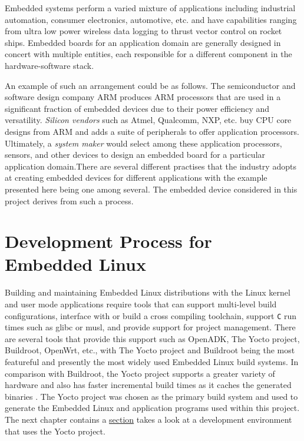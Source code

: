 Embedded systems perform a varied mixture of applications including industrial automation, consumer electronics, automotive, etc. and have capabilities ranging from ultra low power wireless data logging to thrust vector control on rocket ships. Embedded boards for an application domain are generally designed in concert with multiple entities, each responsible for a different component in the hardware-software stack.

An example of such an arrangement could be as follows. The semiconductor and software design company ARM produces ARM processors that are used in a significant fraction of embedded devices due to their power efficiency and versatility. \textit{Silicon vendors} such as Atmel, Qualcomm, NXP, etc. buy CPU core designs from ARM and adds a suite of peripherals to offer application processors. Ultimately, a \textit{system maker} would select among these application processors, sensors, and other devices to design an embedded board for a particular application domain.There are several different practises that the industry adopts at creating embedded devices for different applications with the example presented here being one among several. The embedded device considered in this project derives from such a process.

\section{Development Process for Embedded Linux}

Building and maintaining Embedded Linux distributions with the Linux kernel and user mode applications require tools that can support multi-level build configurations, interface with or build a cross compiling toolchain, support \texttt{C} run times such as glibc or musl, and provide support for project management. There are several tools that provide this support such as OpenADK, The Yocto project, Buildroot, OpenWrt, etc., with The Yocto project and Buildroot being the most featureful and presently the most widely used Embedded Linux build systems. In comparison with Buildroot, the Yocto project supports a greater variety of hardware and also has faster incremental build times as it caches the generated binaries \cite{yocto}. The Yocto project was chosen as the primary build system and used to generate the Embedded Linux and application programs used within this project. The next chapter contains a \hyperref[section:yocto-demo]{section} takes a look at a development environment that uses the Yocto project.

